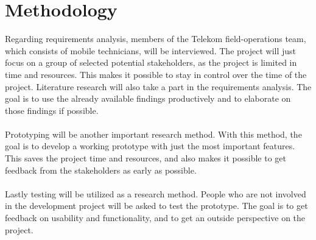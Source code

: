 \newpage
\section{Methodology}
Regarding requirements analysis, members of the Telekom field-operations team, which consists of
mobile technicians, will be interviewed. The project will just focus on a group of selected potential
stakeholders, as the project is limited in time and resources. This makes it possible to stay in 
control over the time of the project. Literature research will also take a part in the requirements 
analysis. The goal is to use the already available findings productively and to elaborate on
those findings if possible. \\ \\
Prototyping will be another important research method. With this method, the goal is to develop a 
working prototype with just the most important features. This saves the project time and resources,
and also makes it possible to get feedback from the stakeholders as early as possible. \\ \\
Lastly testing will be utilized as a research method. People who are not involved in the development 
project will be asked to test the prototype. The goal is to get feedback on usability and functionality, 
and to get an outside perspective on the project. \\